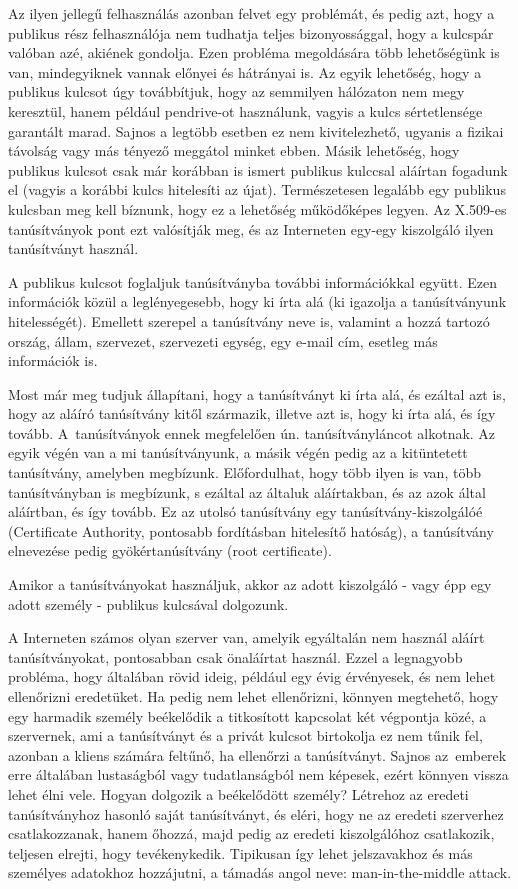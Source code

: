Az ilyen jellegű felhasználás azonban felvet egy problémát, és pedig azt, hogy a publikus rész felhasználója nem
tudhatja teljes bizonyossággal, hogy a kulcspár valóban azé, akiének gondolja. Ezen probléma megoldására több
lehetőségünk is van, mindegyiknek vannak előnyei és hátrányai is. Az egyik lehetőség, hogy a publikus kulcsot úgy
továbbítjuk, hogy az semmilyen hálózaton nem megy keresztül, hanem például pendrive-ot használunk, vagyis a kulcs
sértetlensége garantált marad. Sajnos a legtöbb esetben ez nem kivitelezhető, ugyanis a fizikai távolság vagy más
tényező meggátol minket ebben. Másik lehetőség, hogy publikus kulcsot  csak már korábban is ismert publikus kulccsal
aláírtan fogadunk el (vagyis a korábbi kulcs hitelesíti az újat). Természetesen legalább egy publikus kulcsban meg kell
bíznunk, hogy ez a lehetőség működőképes legyen. Az X.509-es tanúsítványok pont ezt valósítják meg, és az Interneten
egy-egy kiszolgáló ilyen tanúsítványt használ.


A publikus kulcsot foglaljuk tanúsítványba további információkkal együtt. Ezen információk közül a leglényegesebb, hogy
ki írta alá (ki igazolja a tanúsítványunk hitelességét). Emellett szerepel a tanúsítvány neve is, valamint a hozzá
tartozó ország, állam, szervezet, szervezeti egység, egy e-mail cím, esetleg más információk is.

Most már meg tudjuk állapítani, hogy a tanúsítványt ki írta alá, és ezáltal azt is, hogy az aláíró tanúsítvány kitől
származik, illetve azt is, hogy ki írta alá, és így tovább. A~tanúsítványok ennek megfelelően 
ún. tanúsítványláncot alkotnak. Az egyik
végén van a mi tanúsítványunk, a másik végén pedig az a kitüntetett tanúsítvány, amelyben megbízunk. Előfordulhat, hogy
több ilyen is van, több tanúsítványban is megbízunk, s ezáltal az általuk aláírtakban, és az azok által aláírtban, és
így tovább. Ez az utolsó tanúsítvány egy tanúsítvány-kiszolgálóé (Certificate Authority, pontosabb fordításban hitelesítő
hatóság), a tanúsítvány elnevezése pedig gyökértanúsítvány (root certificate).

Amikor a tanúsítványokat használjuk, akkor az adott kiszolgáló - vagy épp egy adott személy - publikus kulcsával
dolgozunk.

A Interneten számos olyan szerver van, amelyik egyáltalán nem használ aláírt tanúsítványokat, pontosabban csak
önaláírtat használ. Ezzel a legnagyobb probléma, hogy általában rövid ideig, például egy évig érvényesek, és nem lehet
ellenőrizni eredetüket. Ha pedig nem lehet ellenőrizni, könnyen megtehető, hogy egy harmadik személy beékelődik a
titkosított kapcsolat két végpontja közé, a szervernek, ami a tanúsítványt és a privát kulcsot birtokolja ez nem tűnik
fel, azonban a kliens számára feltűnő, ha ellenőrzi a tanúsítványt. Sajnos az~emberek erre általában lustaságból vagy
tudatlanságból nem képesek, ezért könnyen vissza lehet élni vele. Hogyan dolgozik a beékelődött személy? Létrehoz az
eredeti tanúsítványhoz hasonló saját tanúsítványt, és eléri, hogy ne az eredeti szerverhez csatlakozzanak, hanem őhozzá,
majd pedig az eredeti kiszolgálóhoz csatlakozik, teljesen elrejti, hogy tevékenykedik. Tipikusan így lehet jelszavakhoz
és más személyes adatokhoz hozzájutni, a támadás angol neve: man-in-the-middle attack.

